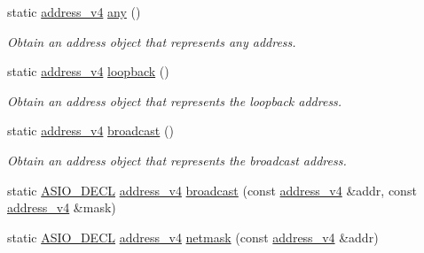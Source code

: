\begin{DoxyCompactItemize}
static \hyperlink{classasio_1_1ip_1_1address__v4}{address\+\_\+v4} \hyperlink{classasio_1_1ip_1_1address__v4_aa8c839a88b3cfc1493e7c7fd83cbeba1}{any} ()
\begin{DoxyCompactList}\small\item\em Obtain an address object that represents any address. \end{DoxyCompactList}\item 
static \hyperlink{classasio_1_1ip_1_1address__v4}{address\+\_\+v4} \hyperlink{classasio_1_1ip_1_1address__v4_a4a716c7fff91f58159f5add64cc67396}{loopback} ()
\begin{DoxyCompactList}\small\item\em Obtain an address object that represents the loopback address. \end{DoxyCompactList}\item 
static \hyperlink{classasio_1_1ip_1_1address__v4}{address\+\_\+v4} \hyperlink{classasio_1_1ip_1_1address__v4_a00d4832800748da8cb7d87951f4d08a0}{broadcast} ()
\begin{DoxyCompactList}\small\item\em Obtain an address object that represents the broadcast address. \end{DoxyCompactList}\item 
static \hyperlink{config_8hpp_ab54d01ea04afeb9a8b39cfac467656b7}{A\+S\+I\+O\+\_\+\+D\+E\+C\+L} \hyperlink{classasio_1_1ip_1_1address__v4}{address\+\_\+v4} \hyperlink{classasio_1_1ip_1_1address__v4_a3a06baf126749f65e39977f162fe22ed}{broadcast} (const \hyperlink{classasio_1_1ip_1_1address__v4}{address\+\_\+v4} \&addr, const \hyperlink{classasio_1_1ip_1_1address__v4}{address\+\_\+v4} \&mask)
\item 
static \hyperlink{config_8hpp_ab54d01ea04afeb9a8b39cfac467656b7}{A\+S\+I\+O\+\_\+\+D\+E\+C\+L} \hyperlink{classasio_1_1ip_1_1address__v4}{address\+\_\+v4} \hyperlink{classasio_1_1ip_1_1address__v4_a742352d923901b94a63a9c6310f32cde}{netmask} (const \hyperlink{classasio_1_1ip_1_1address__v4}{address\+\_\+v4} \&addr)
\end{DoxyCompactItemize}
